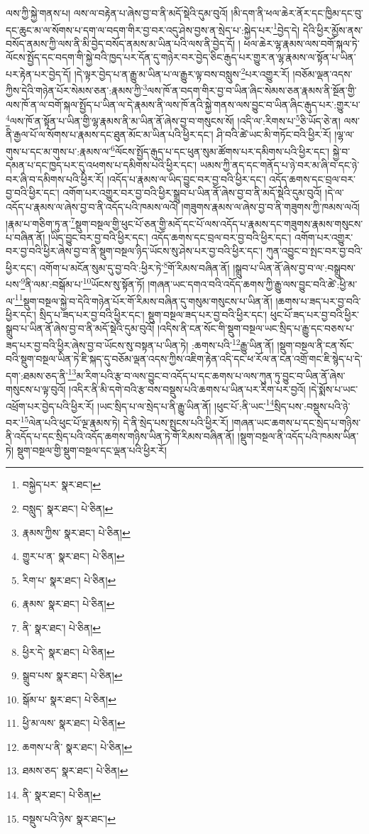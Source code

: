 ལས་ཀྱི་སྐྱེ་གནས་པ། ལས་ལ་བརྟེན་པ་ཞེས་བྱ་བ་ནི་མདོ་སྡེའི་དུམ་བུའོ། །མི་དག་ནི་ཕལ་ཆེར་ནོར་དང་ཁྱིམ་དང་བུ་དང་ཆུང་མ་ལ་སོགས་པ་དག་ལ་བདག་གིར་བྱ་བར་འདུ་ཤེས་བྱས་ན་སྲེད་པ་:སྐྱེད་པར་\footnote{བསྐྱེད་པར་  སྣར་ཐང་། }བྱེད་དེ། དེའི་ཕྱིར་མྱོས་ནས་བསོད་ནམས་ཀྱི་ལས་ནི་མི་བྱེད་བསོད་ནམས་མ་ཡིན་པའི་ལས་ནི་བྱེད་དོ། །
ཕལ་ཆེར་ལྷ་རྣམས་ལས་བགོ་སྐལ་ཏེ་ལོངས་སྤྱོད་དང་བདག་གི་སྐྱེ་བའི་ཁྱད་པར་དོན་དུ་གཉེར་བར་བྱེད་ཅིང་རྒུད་པར་གྱུར་ན་ལྷ་རྣམས་ལ་སྟོན་པ་ཡིན་པར་རྟེན་པར་བྱེད་དོ། །དེ་ལྟར་བྱེད་པ་ན་རྒྱུ་མ་ཡིན་པ་ལ་རྒྱུར་ལྟ་བས་བསླུས་\footnote{བསླུད་  སྣར་ཐང་།  པེ་ཅིན། }པར་འགྱུར་རོ། །བཅོམ་ལྡན་འདས་ཀྱིས་དེའི་གཉེན་པོར་སེམས་ཅན་:རྣམས་ཀྱི་\footnote{རྣམས་ཀྱིས་  སྣར་ཐང་།  པེ་ཅིན། }ལས་ཁོ་ན་བདག་གིར་བྱ་བ་ཡིན་ཞིང་སེམས་ཅན་རྣམས་ནི་སྔོན་གྱི་ལས་ཁོ་ན་ལ་བགོ་སྐལ་སྤྱོད་པ་ཡིན་ལ་དེ་རྣམས་ནི་ལས་ཁོ་ནའི་སྐྱེ་གནས་ལས་བྱུང་བ་ཡིན་ཞིང་རྒུད་པར་:གྱུར་པ་\footnote{གྱུར་པ་ན་  སྣར་ཐང་།  པེ་ཅིན། }ལས་ཁོ་ན་སྟོན་པ་ཡིན་གྱི་ལྷ་རྣམས་ནི་མ་ཡིན་ནོ་ཞེས་བྱ་བ་གསུངས་སོ། །འདི་ལ་:རིགས་པ་\footnote{རིག་པ་  སྣར་ཐང་།  པེ་ཅིན། }ཅི་ཡོད་ཅེ་ན། ལས་ནི་རྒྱལ་པོ་ལ་སོགས་པ་རྣམས་དང་ཐུན་མོང་མ་ཡིན་པའི་ཕྱིར་དང་། ཤི་བའི་ཚེ་ཡང་མི་གཏོང་བའི་ཕྱིར་རོ། །ལྷ་ལ་གུས་པ་དང་མ་གུས་པ་:རྣམས་ལ་\footnote{རྣམས་  སྣར་ཐང་།  པེ་ཅིན། }ལོངས་སྤྱོད་རྒུད་པ་དང་ཕུན་སུམ་ཚོགས་པར་དམིགས་པའི་ཕྱིར་དང་། སྐྱེ་བ་དམན་པ་དང་ཁྱད་པར་དུ་འཕགས་པ་དམིགས་པའི་ཕྱིར་དང་། ཡམས་ཀྱི་ནད་དང་གནོད་པ་ཉེ་བར་མ་ཞི་བ་དང་ཉེ་བར་ཞི་བ་དམིགས་པའི་ཕྱིར་རོ། །འདོད་པ་རྣམས་ལ་ཡིད་བྱུང་བར་བྱ་བའི་ཕྱིར་དང་། འདོད་ཆགས་དང་བྲལ་བར་བྱ་བའི་ཕྱིར་དང་། འགོག་པར་འགྱུར་བར་བྱ་བའི་ཕྱིར་སྒྲུབ་པ་ཡིན་ནོ་ཞེས་བྱ་བ་ནི་མདོ་སྡེའི་དུམ་བུའོ། །དེ་ལ་འདོད་པ་རྣམས་ལ་ཞེས་བྱ་བ་ནི་འདོད་པའི་ཁམས་ལའོ། །གཟུགས་རྣམས་ལ་ཞེས་བྱ་བ་ནི་གཟུགས་ཀྱི་ཁམས་ལའོ། །རྣམ་པ་གཅིག་ཏུ་ན་\footnote{ནི་  སྣར་ཐང་།  པེ་ཅིན། }སྡུག་བསྔལ་གྱི་ཕུང་པོ་ཅན་གྱི་མདོ་དང་པོ་ལས་འདོད་པ་རྣམས་དང་གཟུགས་རྣམས་གསུངས་པ་བཞིན་ནོ། །ཡིད་བྱུང་བར་བྱ་བའི་ཕྱིར་དང་། འདོད་ཆགས་དང་བྲལ་བར་བྱ་བའི་ཕྱིར་དང་། འགོག་པར་འགྱུར་བར་བྱ་བའི་ཕྱིར་ཞེས་བྱ་བ་ནི་སྡུག་བསྔལ་ཉིད་ཡོངས་སུ་ཤེས་པར་བྱ་བའི་ཕྱིར་དང་། ཀུན་འབྱུང་བ་སྤང་བར་བྱ་བའི་ཕྱིར་དང་། འགོག་པ་མངོན་སུམ་དུ་བྱ་བའི་:ཕྱིར་ཏེ་\footnote{ཕྱིར་དེ་  སྣར་ཐང་།  པེ་ཅིན། }གོ་རིམས་བཞིན་ནོ། །སྒྲུབ་པ་ཡིན་ནོ་ཞེས་བྱ་བ་ལ་:བསྒྲུབས་པས་\footnote{སྒྲུབ་པས་  སྣར་ཐང་།  པེ་ཅིན། }ནི་ལམ་:བསྒོམ་པ་\footnote{སྒོམ་པ་  སྣར་ཐང་།  པེ་ཅིན། }ཡོངས་སུ་སྟོན་ཏོ། །གཞན་ཡང་དགའ་བའི་འདོད་ཆགས་ཀྱི་རྒྱུ་ལས་བྱུང་བའི་ཚེ་:ཕྱི་མ་ལ་\footnote{ཕྱི་མ་ལས་  སྣར་ཐང་།  པེ་ཅིན། }སྡུག་བསྔལ་སྐྱེ་བ་དེའི་གཉེན་པོར་གོ་རིམས་བཞིན་དུ་གསུམ་གསུངས་པ་ཡིན་ནོ། །ཆགས་པ་ཟད་པར་བྱ་བའི་ཕྱིར་དང་། སྲིད་པ་ཟད་པར་བྱ་བའི་ཕྱིར་དང་། སྡུག་བསྔལ་ཟད་པར་བྱ་བའི་ཕྱིར་དང་། ཕུང་པོ་ཟད་པར་བྱ་བའི་ཕྱིར་སྒྲུབ་པ་ཡིན་ནོ་ཞེས་བྱ་བ་ནི་མདོ་སྡེའི་དུམ་བུའོ། །འདིས་ནི་ངན་སོང་གི་སྡུག་བསྔལ་ཡང་སྲིད་པ་རྒྱུ་དང་བཅས་པ་ཟད་པར་བྱ་བའི་ཕྱིར་ཞེས་བྱ་བ་ཡོངས་སུ་བསྟན་པ་ཡིན་ཏེ། :ཆགས་པའི་\footnote{ཆགས་པ་ནི་  སྣར་ཐང་།  པེ་ཅིན། }རྒྱུ་ཡིན་ནོ། །སྡུག་བསྔལ་ནི་ངན་སོང་བའི་སྡུག་བསྔལ་ཡིན་ཏེ་ཇི་སྐད་དུ་བཅོམ་ལྡན་འདས་ཀྱིས་འཇིག་རྟེན་འདི་དང་ཕ་རོལ་ན་ངན་འགྲོ་གང་ཇི་སྙེད་པ་དེ་དག་:ཐམས་ཅད་ནི་\footnote{ཐམས་ཅད་  སྣར་ཐང་།  པེ་ཅིན། }མ་རིག་པའི་རྩ་བ་ལས་བྱུང་བ་འདོད་པ་དང་ཆགས་པ་ལས་ཀུན་ཏུ་བྱུང་བ་ཡིན་ནོ་ཞེས་གསུངས་པ་ལྟ་བུའོ། །འདིར་ནི་མི་དགེ་བའི་རྩ་བས་བསྡུས་པའི་ཆགས་པ་ཡིན་པར་རིག་པར་བྱའོ། །དེ་སྨོས་པ་ཡང་འཕྲོག་པར་བྱེད་པའི་ཕྱིར་རོ། །ཡང་སྲིད་པ་ལ་སྲེད་པ་ནི་རྒྱུ་ཡིན་ནོ། །ཕུང་པོ་:ནི་ཡང་\footnote{ནི་  སྣར་ཐང་།  པེ་ཅིན། }སྲིད་པས་:བསྡུས་པའི་ཉེ་བར་\footnote{བསྡུས་པའི་ཉེས་  སྣར་ཐང་། }ལེན་པའི་ཕུང་པོ་ལྔ་རྣམས་ཏེ། དེ་ནི་སྲེད་པས་སྤུངས་པའི་ཕྱིར་རོ། །གཞན་ཡང་ཆགས་པ་དང་སྲེད་པ་གཉིས་ནི་འདོད་པ་དང་སྲིད་པའི་འདོད་ཆགས་གཉིས་ཡིན་ཏེ་གོ་རིམས་བཞིན་ནོ། །སྡུག་བསྔལ་ནི་འདོད་པའི་ཁམས་ཡིན་ཏེ། སྡུག་བསྔལ་གྱི་སྡུག་བསྔལ་དང་ལྡན་པའི་ཕྱིར་རོ། 